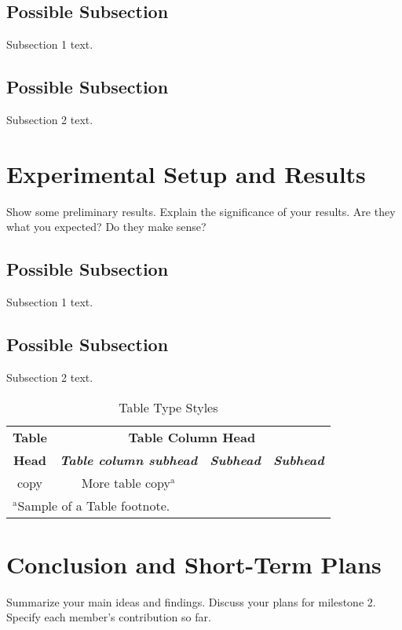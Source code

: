 \documentclass[conference]{IEEEtran}
\begin{document}
\subsection{Possible Subsection}
Subsection 1 text.

\subsection{Possible Subsection}
Subsection 2 text.


\section{Experimental Setup and Results}
Show some preliminary results. Explain the significance of your results. Are they what you expected? Do they make sense?

\subsection{Possible Subsection}
Subsection 1 text.

\subsection{Possible Subsection}
Subsection 2 text.

\begin{table}[htbp]
    \caption{Table Type Styles}
    \begin{center}
        \begin{tabular}{|c|c|c|c|}
            \hline
            \textbf{Table} & \multicolumn{3}{|c|}{\textbf{Table Column Head}}                                                         \\
            \cline{2-4}
            \textbf{Head}  & \textbf{\textit{Table column subhead}}           & \textbf{\textit{Subhead}} & \textbf{\textit{Subhead}} \\
            \hline
            copy           & More table copy$^{\mathrm{a}}$                   &                           &                           \\
            \hline
            \multicolumn{4}{l}{$^{\mathrm{a}}$Sample of a Table footnote.}
        \end{tabular}
        \label{tab1}
    \end{center}
\end{table}

\section{Conclusion and Short-Term Plans}
Summarize your main ideas and findings. Discuss your plans for milestone 2. Specify each member’s contribution so far.


\begin{thebibliography}{00}
\end{thebibliography}
\end{document}
